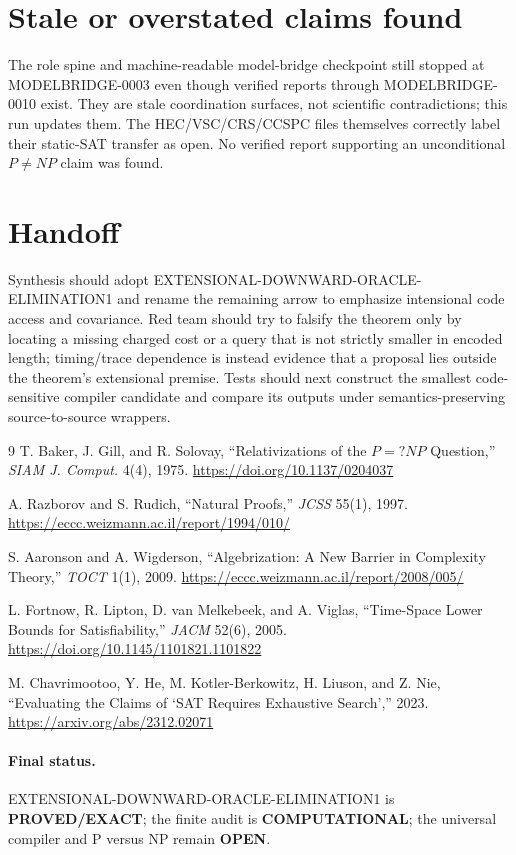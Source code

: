 \documentclass[11pt]{article}
\newcommand{\OPEN}{\textbf{OPEN}}
\newcommand{\EXACT}{\textbf{PROVED/EXACT}}
\begin{document}
\section{Stale or overstated claims found}

The role spine and machine-readable model-bridge checkpoint still stopped at
MODELBRIDGE-0003 even though verified reports through MODELBRIDGE-0010 exist.
They are stale coordination surfaces, not scientific contradictions; this run
updates them.  The HEC/VSC/CRS/CCSPC files themselves correctly label their
static-SAT transfer as open.  No verified report supporting an unconditional
$P\ne NP$ claim was found.

\section{Handoff}

Synthesis should adopt EXTENSIONAL-DOWNWARD-ORACLE-ELIMINATION1 and rename the
remaining arrow to emphasize intensional code access and covariance.  Red team
should try to falsify the theorem only by locating a missing charged cost or a
query that is not strictly smaller in encoded length; timing/trace dependence
is instead evidence that a proposal lies outside the theorem's extensional
premise.  Tests should next construct the smallest code-sensitive compiler
candidate and compare its outputs under semantics-preserving source-to-source
wrappers.

\begin{thebibliography}{9}
T. Baker, J. Gill, and R. Solovay,
``Relativizations of the $P=?NP$ Question,'' \emph{SIAM J. Comput.} 4(4),
1975. \url{https://doi.org/10.1137/0204037}

A. Razborov and S. Rudich, ``Natural Proofs,'' \emph{JCSS} 55(1), 1997.
\url{https://eccc.weizmann.ac.il/report/1994/010/}

S. Aaronson and A. Wigderson, ``Algebrization: A New Barrier in Complexity
Theory,'' \emph{TOCT} 1(1), 2009.
\url{https://eccc.weizmann.ac.il/report/2008/005/}

L. Fortnow, R. Lipton, D. van Melkebeek, and A. Viglas,
``Time-Space Lower Bounds for Satisfiability,'' \emph{JACM} 52(6), 2005.
\url{https://doi.org/10.1145/1101821.1101822}

M. Chavrimootoo, Y. He, M. Kotler-Berkowitz, H. Liuson, and Z. Nie,
``Evaluating the Claims of `SAT Requires Exhaustive Search','' 2023.
\url{https://arxiv.org/abs/2312.02071}
\end{thebibliography}

\paragraph{Final status.}
EXTENSIONAL-DOWNWARD-ORACLE-ELIMINATION1 is \EXACT; the finite audit is
\textbf{COMPUTATIONAL}; the universal compiler and P versus NP remain \OPEN.

\end{document}
